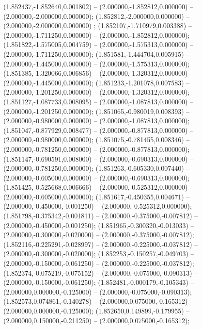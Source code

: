  (1.852437,-1.852640,0.001802) -- (2.000000,-1.852812,0.000000) -- (2.000000,-2.000000,0.000000);
 (1.852812,-2.000000,0.000000) -- (2.000000,-2.000000,0.000000) ;
 (1.852107,-1.710979,0.003388) -- (2.000000,-1.711250,0.000000) -- (2.000000,-1.852812,0.000000);
 (1.851822,-1.575005,0.004759) -- (2.000000,-1.575313,0.000000) -- (2.000000,-1.711250,0.000000);
 (1.851581,-1.444704,0.005915) -- (2.000000,-1.445000,0.000000) -- (2.000000,-1.575313,0.000000);
 (1.851385,-1.320066,0.006856) -- (2.000000,-1.320312,0.000000) -- (2.000000,-1.445000,0.000000);
 (1.851233,-1.201078,0.007583) -- (2.000000,-1.201250,0.000000) -- (2.000000,-1.320312,0.000000);
 (1.851127,-1.087733,0.008095) -- (2.000000,-1.087813,0.000000) -- (2.000000,-1.201250,0.000000);
 (1.851065,-0.980019,0.008393) -- (2.000000,-0.980000,0.000000) -- (2.000000,-1.087813,0.000000);
 (1.851047,-0.877929,0.008477) -- (2.000000,-0.877813,0.000000) -- (2.000000,-0.980000,0.000000);
 (1.851075,-0.781455,0.008346) -- (2.000000,-0.781250,0.000000) -- (2.000000,-0.877813,0.000000);
 (1.851147,-0.690591,0.008000) -- (2.000000,-0.690313,0.000000) -- (2.000000,-0.781250,0.000000);
 (1.851263,-0.605330,0.007440) -- (2.000000,-0.605000,0.000000) -- (2.000000,-0.690313,0.000000);
 (1.851425,-0.525668,0.006666) -- (2.000000,-0.525312,0.000000) -- (2.000000,-0.605000,0.000000);
 (1.851617,-0.450355,0.004671) -- (2.000000,-0.450000,-0.001250) -- (2.000000,-0.525312,0.000000);
 (1.851798,-0.375342,-0.001811) -- (2.000000,-0.375000,-0.007812) -- (2.000000,-0.450000,-0.001250);
 (1.851965,-0.300320,-0.013033) -- (2.000000,-0.300000,-0.020000) -- (2.000000,-0.375000,-0.007812);
 (1.852116,-0.225291,-0.028997) -- (2.000000,-0.225000,-0.037812) -- (2.000000,-0.300000,-0.020000);
 (1.852253,-0.150257,-0.049703) -- (2.000000,-0.150000,-0.061250) -- (2.000000,-0.225000,-0.037812);
 (1.852374,-0.075219,-0.075152) -- (2.000000,-0.075000,-0.090313) -- (2.000000,-0.150000,-0.061250);
 (1.852481,-0.000179,-0.105343) -- (2.000000,0.000000,-0.125000) -- (2.000000,-0.075000,-0.090313);
 (1.852573,0.074861,-0.140278) -- (2.000000,0.075000,-0.165312) -- (2.000000,0.000000,-0.125000);
 (1.852650,0.149899,-0.179955) -- (2.000000,0.150000,-0.211250) -- (2.000000,0.075000,-0.165312);
